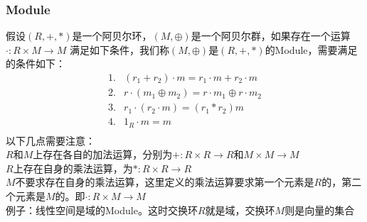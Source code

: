 \documentclass{article}
\begin{document}
\begin{CJK}{UTF8}{gkai}
\subsubsection*{Module}
假设$(R,+,\ast)$是一个阿贝尔环，$(M,\oplus)$是一个阿贝尔群，如果存在一个运算$\cdot:R\times M \rightarrow M$ 满足如下条件，我们称$(M,\oplus)$是$(R,+,\ast)$的Module，需要满足的条件如下：
\[
\begin{aligned}
1.& (r_1 + r_2 ) \cdot m = r_1 \cdot m + r_2 \cdot m\\
2.& r\cdot(m_1\oplus m_2) = r\cdot m_1 \oplus r\cdot m_2\\
3.& r_1\cdot(r_2\cdot m) = (r_1 \ast r_2) m \\
4.& 1_R \cdot m = m\\
\end{aligned}
\]
以下几点需要注意：\\

$R$和$M$上存在各自的加法运算，分别为$+:R\times R \rightarrow R$和$M\times M \rightarrow M$\\

$R$上存在自身的乘法运算，为$\ast:R\times R \rightarrow R$\\

$M$不要求存在自身的乘法运算，这里定义的乘法运算要求第一个元素是$R$的，第二个元素是$M$的。即$\cdot: R\times M \rightarrow M$\\

例子：线性空间是域的Module。这时交换环$R$就是域，交换环$M$则是向量的集合\\

\end{CJK}
\end{document}
